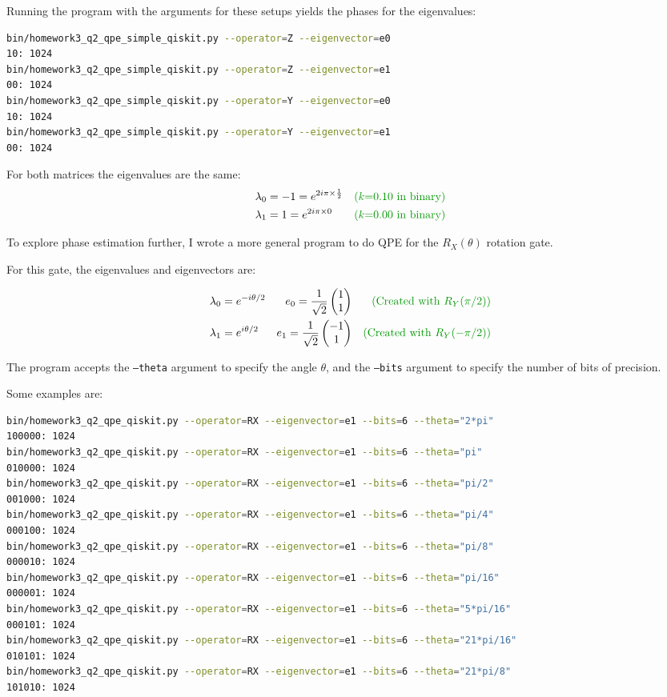 \documentclass[12pt]{extarticle}
\begin{document}
Running the program with the arguments for these setups yields the phases for the eigenvalues:

\begin{lstlisting}[language=bash]
bin/homework3_q2_qpe_simple_qiskit.py --operator=Z --eigenvector=e0
10: 1024
bin/homework3_q2_qpe_simple_qiskit.py --operator=Z --eigenvector=e1
00: 1024
bin/homework3_q2_qpe_simple_qiskit.py --operator=Y --eigenvector=e0
10: 1024
bin/homework3_q2_qpe_simple_qiskit.py --operator=Y --eigenvector=e1
00: 1024
\end{lstlisting}

For both matrices the eigenvalues are the same:
\begin{align*}
\lambda_0 &= -1 = e^{2i\pi\times \frac{1}{2}} && \expl{$k$=0.10 in binary}\\
\lambda_1 &= 1 = e^{2i\pi\times 0} && \expl{$k$=0.00 in binary}\\
\end{align*}

To explore phase estimation further, I wrote a more general program to do QPE for the $R_X(\theta)$ rotation gate.

For this gate, the eigenvalues and eigenvectors are:

\begin{align*}
\lambda_0 &= e^{-i\theta/2} & e_0 = \frac{1}{\sqrt{2}}\begin{pmatrix} 1 \\ 1 \end{pmatrix} && \expl{Created with $R_Y(\pi/2)$}\\
\lambda_1 &= e^{i\theta/2} & e_1 = \frac{1}{\sqrt{2}}\begin{pmatrix} -1 \\ 1 \end{pmatrix} && \expl{Created with $R_Y(-\pi/2)$}\\
\end{align*}

The program accepts the \texttt{---theta} argument to specify the angle $\theta$, and the \texttt{---bits} argument to specify the number of bits of precision.

Some examples are:

\begin{lstlisting}[language=bash,basicstyle=\tiny]
bin/homework3_q2_qpe_qiskit.py --operator=RX --eigenvector=e1 --bits=6 --theta="2*pi"
100000: 1024
bin/homework3_q2_qpe_qiskit.py --operator=RX --eigenvector=e1 --bits=6 --theta="pi"
010000: 1024
bin/homework3_q2_qpe_qiskit.py --operator=RX --eigenvector=e1 --bits=6 --theta="pi/2"
001000: 1024
bin/homework3_q2_qpe_qiskit.py --operator=RX --eigenvector=e1 --bits=6 --theta="pi/4"
000100: 1024
bin/homework3_q2_qpe_qiskit.py --operator=RX --eigenvector=e1 --bits=6 --theta="pi/8"
000010: 1024
bin/homework3_q2_qpe_qiskit.py --operator=RX --eigenvector=e1 --bits=6 --theta="pi/16"
000001: 1024
bin/homework3_q2_qpe_qiskit.py --operator=RX --eigenvector=e1 --bits=6 --theta="5*pi/16"
000101: 1024
bin/homework3_q2_qpe_qiskit.py --operator=RX --eigenvector=e1 --bits=6 --theta="21*pi/16"
010101: 1024
bin/homework3_q2_qpe_qiskit.py --operator=RX --eigenvector=e1 --bits=6 --theta="21*pi/8"
101010: 1024
\end{lstlisting}
\end{document}

